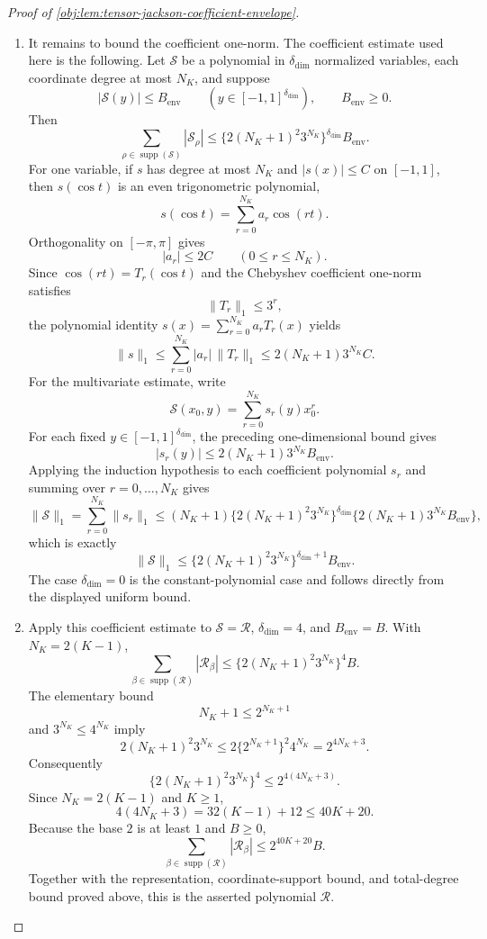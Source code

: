 \documentclass[11pt]{article}
\begin{document}
\begin{proof}[Proof of \cref{obj:lem:tensor-jackson-coefficient-envelope}]
\begin{enumerate}
\item
It remains to bound the coefficient one-norm.  The coefficient estimate used here is the following.  Let \(\mathcal S\) be a polynomial in \(\delta_{\mathrm{dim}}\) normalized variables, each coordinate degree at most \(N_K\), and suppose
\[
|\mathcal S(y)|\le B_{\mathrm{env}}
\qquad
(y\in[-1,1]^{\delta_{\mathrm{dim}}}),
\qquad
B_{\mathrm{env}}\ge0 .
\]
Then
\[
\sum_{\rho\in\operatorname{supp}(\mathcal S)}
|\mathcal S_\rho|
\le
\{2(N_K+1)^2 3^{N_K}\}^{\delta_{\mathrm{dim}}}
B_{\mathrm{env}} .
\]
For one variable, if \(s\) has degree at most \(N_K\) and \(|s(x)|\le C\) on \([-1,1]\), then \(s(\cos t)\) is an even trigonometric polynomial,
\[
s(\cos t)=\sum_{r=0}^{N_K} a_r\cos(rt).
\]
Orthogonality on \([-\pi,\pi]\) gives
\[
|a_r|\le 2C
\qquad (0\le r\le N_K).
\]
Since \(\cos(rt)=T_r(\cos t)\) and the Chebyshev coefficient one-norm satisfies
\[
\|T_r\|_1\le 3^r,
\]
the polynomial identity \(s(x)=\sum_{r=0}^{N_K}a_rT_r(x)\) yields
\[
\|s\|_1
\le
\sum_{r=0}^{N_K}|a_r|\,\|T_r\|_1
\le
2(N_K+1)3^{N_K}C .
\]
For the multivariate estimate, write
\[
\mathcal S(x_0,y)
=
\sum_{r=0}^{N_K}s_r(y)x_0^r .
\]
For each fixed \(y\in[-1,1]^{\delta_{\mathrm{dim}}}\), the preceding one-dimensional bound gives
\[
|s_r(y)|
\le
2(N_K+1)3^{N_K}B_{\mathrm{env}} .
\]
Applying the induction hypothesis to each coefficient polynomial \(s_r\) and summing over \(r=0,\ldots,N_K\) gives
\[
\|\mathcal S\|_1
=
\sum_{r=0}^{N_K}\|s_r\|_1
\le
(N_K+1)\{2(N_K+1)^2 3^{N_K}\}^{\delta_{\mathrm{dim}}}
\{2(N_K+1)3^{N_K}B_{\mathrm{env}}\},
\]
which is exactly
\[
\|\mathcal S\|_1
\le
\{2(N_K+1)^2 3^{N_K}\}^{\delta_{\mathrm{dim}}+1}
B_{\mathrm{env}} .
\]
The case \(\delta_{\mathrm{dim}}=0\) is the constant-polynomial case and follows directly from the displayed uniform bound. %

\item
Apply this coefficient estimate to \(\mathcal S=\mathcal R\), \(\delta_{\mathrm{dim}}=4\), and \(B_{\mathrm{env}}=B\).  With \(N_K=2(K-1)\),
\[
\sum_{\beta\in\operatorname{supp}(\mathcal R)}
|\mathcal R_\beta|
\le
\{2(N_K+1)^2 3^{N_K}\}^{4}B .
\]
The elementary bound
\[
N_K+1\le 2^{N_K+1}
\]
and \(3^{N_K}\le4^{N_K}\) imply
\[
2(N_K+1)^2 3^{N_K}
\le
2\{2^{N_K+1}\}^2 4^{N_K}
=
2^{4N_K+3}.
\]
Consequently
\[
\{2(N_K+1)^2 3^{N_K}\}^{4}
\le
2^{4(4N_K+3)} .
\]
Since \(N_K=2(K-1)\) and \(K\ge1\),
\[
4(4N_K+3)
=
32(K-1)+12
\le
40K+20 .
\]
Because the base \(2\) is at least \(1\) and \(B\ge0\),
\[
\sum_{\beta\in\operatorname{supp}(\mathcal R)}
|\mathcal R_\beta|
\le
2^{40K+20}B .
\]
Together with the representation, coordinate-support bound, and total-degree bound proved above, this is the asserted polynomial \(\mathcal R\). %
\end{enumerate}
\end{proof}
\end{document}
